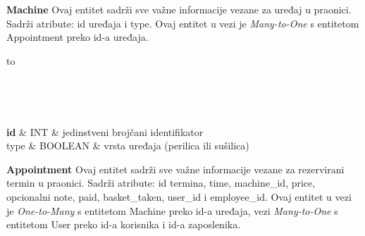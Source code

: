 			\noindent\textbf{Machine}  Ovaj entitet sadrži sve važne informacije vezane za uređaj u praonici. Sadrži atribute: id uređaja i type. Ovaj entitet u vezi je \textit{Many-to-One} s entitetom Appointment preko id-a uređaja.
			
			\begin{longtabu} to \textwidth {|X[8, l]|X[6, l]|X[20, l]|}
				
				\hline {}	 \\[3pt] \hline
				\endfirsthead
				
				\hline {}	 \\[3pt] \hline
				\endhead
				
				\hline 
				\endlastfoot
				
				\textbf{id} & INT	&  jedinstveni brojčani identifikator	\\ \hline
				type & BOOLEAN &  vrsta uređaja (perilica ili sušilica)\\ \hline 
				
				
			\end{longtabu}
		
			\noindent\textbf{Appointment}  Ovaj entitet sadrži sve važne informacije vezane za rezervirani termin u praonici. Sadrži atribute: id termina, time, machine\_id, price, opcionalni note, paid, basket\_taken, user\_id i employee\_id. Ovaj entitet u vezi je \textit{One-to-Many} s entitetom Machine preko id-a uređaja, vezi \textit{Many-to-One} s entitetom User preko id-a korisnika i id-a zaposlenika.
		
